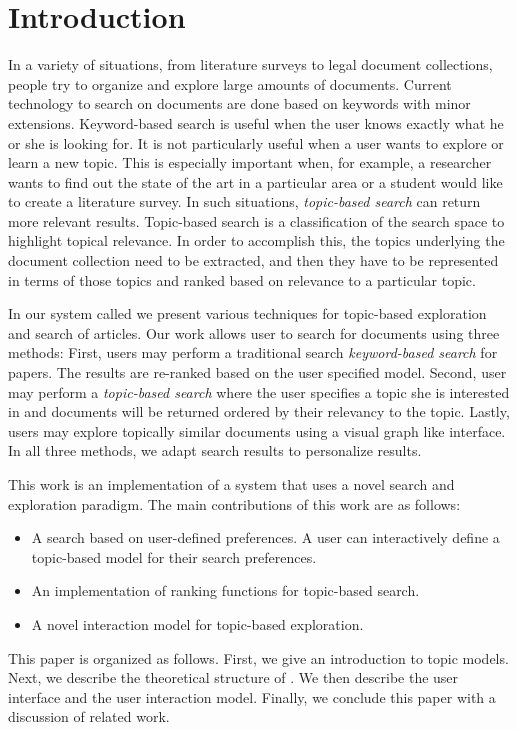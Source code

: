 \section{Introduction}

In a variety of situations, from literature surveys to legal 
document collections, people try to organize and explore large 
amounts of documents. Current technology to search on documents are 
done based on keywords with minor extensions. Keyword-based search is useful when the 
user knows exactly what he or she is looking for. It is not 
particularly useful when a user wants to explore or learn a new 
topic. This is especially important when, for example, a researcher 
wants to find out the state of the art in a particular area or a 
student would like to create a literature survey. In such situations, 
\textsl{topic-based search} can return more relevant results. 
Topic-based search is a classification of the search space to 
highlight topical relevance. In order to accomplish this, the topics 
underlying the document collection need to be extracted, and then 
they have to be represented in terms of those topics and ranked 
based on relevance to a particular topic. 

In our system called 
\system we present various techniques for topic-based exploration 
and search of articles. Our work allows user 
to search for documents using three methods: 
First, users may perform a traditional search \textsl{keyword-based search} for 
papers. The results are re-ranked based on the user specified model. 
Second, user may perform a \textsl{topic-based search} where the user specifies 
a topic she is interested in and documents will be returned ordered 
by their relevancy to the topic.
Lastly, users 
may explore topically similar documents using a visual 
graph like interface. In all 
three methods, we adapt search results to personalize results.


This work is an implementation of a system that uses a novel search and 
exploration paradigm. The main contributions of this work are as follows:
\begin{itemize}
\item A search based on user-defined preferences. A user can
interactively define a topic-based model for their search preferences.
\item An implementation of ranking functions for topic-based search.
\item A novel interaction model for topic-based exploration.
\end{itemize}

This paper is organized as follows. First, we give an introduction 
to topic models. Next, we describe the theoretical structure of \system.
We then describe the user interface and the user interaction model.
Finally, we conclude this paper with a discussion of related work.





